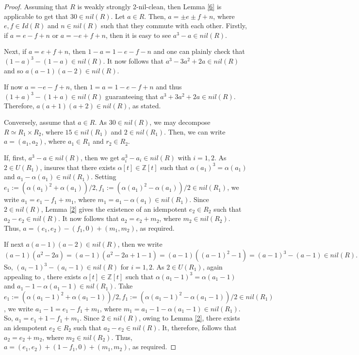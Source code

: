 \documentclass[12pt]{amsart}
\theoremstyle{definition}
\begin{document}
\begin{proof} Assuming that $R$ is weakly strongly 2-nil-clean, then Lemma \ref{6} is applicable to get that $30\in nil(R)$. Let $a\in R$. Then, $a=\pm e\pm f+n$, where $e,f\in Id(R)$ and $n\in nil(R)$ such that they commute with each other. Firstly, if $a=e-f+n$ or $a=-e+f+n$, then it is easy to see $a^3-a\in nil(R)$.

Next, if $a=e+f+n$, then $1-a=1-e-f-n$ and one can plainly check that $(1-a)^3-(1-a)\in nil(R)$. It now follows that $a^3-3a^2+2a\in nil(R)$ and so $a(a-1)(a-2)\in nil(R)$.

If now $a=-e-f+n$, then $1=a=1-e-f+n$ and thus $(1+a)^3-(1+a)\in nil(R)$ guaranteeing that $a^3+3a^2+2a\in nil(R)$.  Therefore, $a(a+1)(a+2)\in nil(R)$, as stated.

Conversely, assume that $a\in R$. As $30\in nil(R)$, we may decompose $R\simeq R_1\times R_2$, where $15\in nil(R_1)$ and $2\in nil(R_1)$. Then, we can write $a=(a_1,a_2)$, where $a_1\in R_1$ and $r_2\in R_2$.

If, first, $a^3-a\in nil(R)$, then we get $a_i^3-a_i\in nil(R)$ with $i=1,2$. As $2\in U(R_1)$,
\cite[Lemma 2.6]{zhou} insures that there exists $\alpha[t]\in \mathbb{Z}[t]$ such that $\alpha(a_1)^3=\alpha(a_1)$ and $a_1-\alpha(a_1)\in nil(R_1)$. Setting $e_1:=(\alpha(a_1)^2+\alpha(a_1))/2,f_1:=(\alpha(a_1)^2-\alpha(a_1))/2\in nil(R_1)$, we write $a_1=e_1-f_1+m_1$, where $m_1=a_1-\alpha(a_1)\in nil(R_1)$. Since $2\in nil(R)$, Lemma \ref{2} gives the existence of an idempotent $e_2\in R_2$ such that $a_2-e_2\in nil(R)$. It now follows that $a_2=e_2+m_2$, where $m_2 \in nil(R_2)$. Thus, $a=(e_1,e_2)-(f_1,0)+(m_1,m_2)$, as required.

If next $a(a-1)(a-2)\in nil(R)$, then we write $$(a-1)(a^2-2a)=(a-1)(a^2-2a+1-1)=(a-1)((a-1)^2-1)=(a-1)^3-(a-1)\in nil(R).$$ So, $(a_i-1)^3-(a_i-1)\in nil(R)$ for $i=1,2$. As $2\in U(R_1)$, again appealing to \cite[lemma 2.6]{zhou}, there exists $\alpha[t]\in \mathbb{Z}[t]$ such that $\alpha(a_1-1)^3=\alpha(a_1-1)$ and $a_1-1-\alpha(a_1-1)\in nil(R_1)$. Take $e_1:=(\alpha(a_1-1)^2+\alpha(a_1-1))/2,f_1:=(\alpha(a_1-1)^2-\alpha(a_1-1))/2\in nil(R_1)$, we write $a_1-1=e_1-f_1+m_1$, where $m_1=a_1-1-\alpha(a_1-1)\in nil(R_1)$. So, $a_1=e_1+1-f_1+m_1$. Since $2\in nil(R)$, owing to Lemma \ref{2}, there exists an idempotent $e_2\in R_2$ such that $a_2-e_2\in nil(R)$. It, therefore, follows that $a_2=e_2+m_2$, where $m_2 \in nil(R_2)$. Thus, $a=(e_1,e_2)+(1-f_1,0)+(m_1,m_2)$, as required.


\end{proof}
\end{document}
